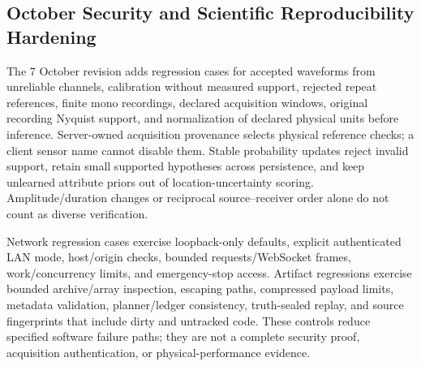 \documentclass[conference]{IEEEtran}
\begin{document}
\subsection{October Security and Scientific Reproducibility Hardening}
The 7 October revision adds regression cases for accepted waveforms from unreliable channels, calibration without measured support, rejected repeat references, finite mono recordings, declared acquisition windows, original recording Nyquist support, and normalization of declared physical units before inference. Server-owned acquisition provenance selects physical reference checks; a client sensor name cannot disable them. Stable probability updates reject invalid support, retain small supported hypotheses across persistence, and keep unlearned attribute priors out of location-uncertainty scoring. Amplitude/duration changes or reciprocal source--receiver order alone do not count as diverse verification.

Network regression cases exercise loopback-only defaults, explicit authenticated LAN mode, host/origin checks, bounded requests/WebSocket frames, work/concurrency limits, and emergency-stop access. Artifact regressions exercise bounded archive/array inspection, escaping paths, compressed payload limits, metadata validation, planner/ledger consistency, truth-sealed replay, and source fingerprints that include dirty and untracked code. These controls reduce specified software failure paths; they are not a complete security proof, acquisition authentication, or physical-performance evidence.


\end{document}
